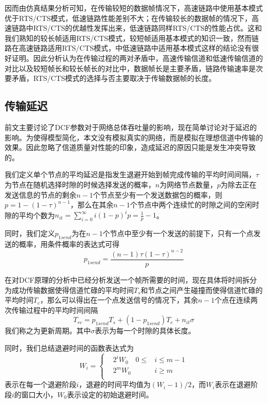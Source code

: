 \documentclass{article}
\begin{document}
因而由仿真结果分析可知，在传输较短的数据帧情况下，高速链路中使用基本模式优于RTS/CTS模式，低速链路性能差别不大；在传输较长的数据帧的情况下，高速链路中RTS/CTS的优越性发挥出来，低速链路同样RTS/CTS的性能占优。这和我们熟知的较长帧适用RTS/CTS模式，较短帧适用基本模式的知识一致，然而链路在高速链路适用RTS/CTS模式，中低速链路中适用基本模式这样的结论\cite{1}没有很好证明。因此分析认为在传输过程的两对矛盾中，高速传输信道和低速传输信道的对比以及较短帧长和较长帧长的对比中，数据帧长是主要矛盾，链路传输速率是次要矛盾，RTS/CTS模式的选择与否主要取决于传输数据帧的长度。

\subsection{传输延迟}
前文主要讨论了DCF参数对于网络总体吞吐量的影响，现在简单讨论对于延迟的影响。为使得模型简化，本文没有模拟真实的网络，而是模拟在理想信道中传输的效果。因此忽略了信道质量对性能的印象，造成延迟的原因只能是发生冲突导致的。

我们定义单个节点的平均延迟是指发生退避开始到帧完成传输的平均时间间隔，$\tau$为节点在随机选择时隙的时候选择发送的概率，$n$为网络节点数量，$p$为除去正在发送信息的节点的剩余$n-1$个节点至少有一个发送数据包的概率，则$p=1-(1-\tau )^{n-1}$，那么在其余$n-1$个节点中两个连续忙的时隙之间的空闲时隙的平均个数为$n_{it}=\sum_{i=0}^{\infty}{i(1-p)^{i}p}=\frac{1}{p}-1$。

同时，我们定义$p_{1send}$为在$n-1$个节点中至少有一个发送的前提下，只有一个点发送的概率，用条件概率的表达式可得
\begin{equation}
p_{1send}=\frac{(n-1)\tau(1-\tau)^{n-2}}{p}
\end{equation}

在对DCF原理的分析中已经分析发送一个帧所需要的时间，现在具体将时间拆分为成功传输数据使得信道忙碌的平均时间$T_{s}$和节点之间产生碰撞而使得信道忙碌的平均时间$T_{c}$，那么可以得出在一个点发送信号的情况下，其余$n-1$个点在连续两次传输过程中的平均时间间隔
\begin{equation}
T_{rc}=p_{1send}T_{s}+(1-p_{1send})T_{c}+n_{it}\sigma
\end{equation}
我们称之为更新周期。其中$\sigma$表示为每一个时隙的具体长度。

同时，我们总结退避时间的函数表达式为
\begin{equation}
W_{i}=
\left\{
\begin{aligned}
&2^iW_{0}\quad 
0\leqslant &i\leqslant m-1\\
&2^mW_{0}\quad 			  &i\geqslant m\\
\end{aligned}
\right.
\end{equation}
表示在每一个退避阶段$i$，退避的时间平均值为$(W_{i}-1)/2$，而$W_{i}$表示在退避阶段$i$的窗口大小，$W_{0}$表示设定的初始退避时间。
\end{document}
